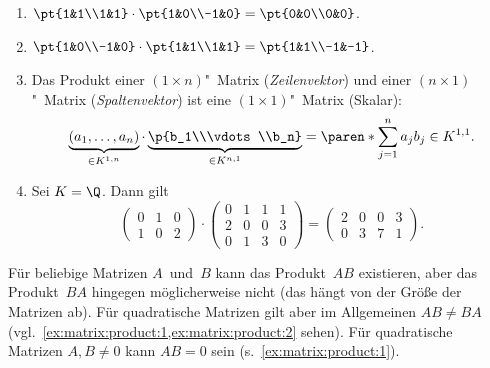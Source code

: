 \documentclass[a4paper]{article}
\begin{document}
\begin{example}\label{ex:matrix:product}\leavevmode
    \begin{enumerate}
        \item $\pt{1&1\\1&1} \cdot \pt{1&0\\-1&0} = \pt{0&0\\0&0}$.\label{ex:matrix:product:1}
        \item $\pt{1&0\\-1&0} \cdot \pt{1&1\\1&1} = \pt{1&1\\-1&-1}$.\label{ex:matrix:product:2}
        \item Das Produkt einer $(1\times n)$"~Matrix (\emph{Zeilenvektor}) und einer $(n\times1)$"~Matrix (\emph{Spaltenvektor}) ist eine $(1\times1)$"~Matrix (Skalar):
              \begin{equation*}
                  \underbrace{(a_1,\dots,a_n)}_{\in K^{1,n}} \cdot \underbrace{\p{b_1\\\vdots\\b_n}}_{\in K^{n, 1}} = \paren*{\sum_{j=1}^n a_jb_j} \in K^{1, 1}.
              \end{equation*}
        \item Sei $K = \Q$. Dann gilt
              \begin{equation*}
                  \begin{pmatrix}
                      0 & 1 & 0 \\
                      1 & 0 & 2
                  \end{pmatrix}
                  \cdot \begin{pmatrix}
                      0 & 1 & 1 & 1 \\
                      2 & 0 & 0 & 3 \\
                      0 & 1 & 3 & 0
                  \end{pmatrix}
                  = \begin{pmatrix}
                      2 & 0 & 0 & 3 \\
                      0 & 3 & 7 & 1
                  \end{pmatrix}.
              \end{equation*}
    \end{enumerate}
\end{example}

\begin{remark}
    Für beliebige Matrizen $A$~und~$B$ kann das Produkt~$AB$ existieren, aber das Produkt~$BA$ hingegen möglicherweise nicht (das hängt von der Größe der Matrizen ab). Für quadratische Matrizen gilt aber im Allgemeinen $AB \neq BA$ (vgl.~\cref{ex:matrix:product:1,ex:matrix:product:2} sehen). Für quadratische Matrizen $A,B \neq 0$ kann $AB = 0$ sein (s.~\cref{ex:matrix:product:1}).
\end{remark}
\end{document}
